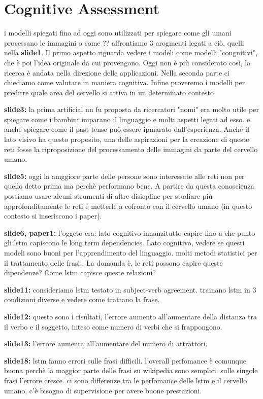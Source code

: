 \chapter{Cognitive Assessment}
i modelli spiegati fino ad oggi sono utilizzati per spiegare come gli umani processano le immagini
o come ?? affrontiamo 3 arogmenti legati a ciò, quelli nella \textbf{slide1}. Il primo aspetto riguarda 
vedere i modeli come modelli "congnitivi", che è poi l'idea originale da cui provengono. Oggi non è più
considerato così, la ricerca è andata nella direzione delle applicazioni. Nella seconda parte ci chiediamo
come valutare in maniera cognitiva. Infine proveremo i modelli per predirre quale area del cervello si attiva
in un determinato contesto

\textbf{slide3:} la prima artificial nn fu proposta da ricercatori "nomi" era molto utile per spiegare
come i bambini imparano il linguaggio e molti aspetti legati ad esso. e anche spiegare come il past tense
può essere ipmarato dall'esperienza. Anche il lato visivo ha questo proposito, una delle aspirazioni per la
creazione di queste reti fosse la riproposizione del processamento delle immagini da parte del cervello umano.

\textbf{slide5:} oggi la amggiore parte delle persone sono interessate alle reti non per quello detto prima
ma perchè performano bene. A partire da questa conoscienza possiamo usare alcuni strumenti di altre
disicpline per studiare più approfonditamente le reti e metterle a cofronto con il cervello umano (in
questo contesto si inseriscono i paper).

\textbf{slide6, paper1:} l'oggeto era: lato cognitivo innanzitutto capire fino a che punto gli 
lstm capiscono le long term dependencies. Lato cognitivo, vedere se questi modeli sono buoni
per l'apprendimento del linguaggio. molti metodi statistici per il trattamento delle frasi.. 
La domanda è, le reti possono capire queste dipendenze? Come lstm capisce queste relazioni?

\textbf{slide11:} consideriamo lstm testato in subject-verb agreement. trainano lstm in 3 condizioni 
diverse e vedere come trattano la frase.

\textbf{slide12:} questo sono i risultati, l'errore aumento all'aumentare della distanza tra il
verbo e il soggetto, inteso come numero di verbi che si frappongono. 

\textbf{slide13:} l'errore aumenta all'aumentare del numero di attrattori. 

\textbf{slide18:} lstm fanno errori sulle frasi difficili. l'overall perfomance è comunque buona perchè
la maggior parte delle frasi su wikipedia sono semplici. sulle singole frasi l'errore cresce. ci sono
differenze tra le perfomance delle lstm e il cervello umano, c'è bisogno di supervisione per avere
buone prestazioni.

